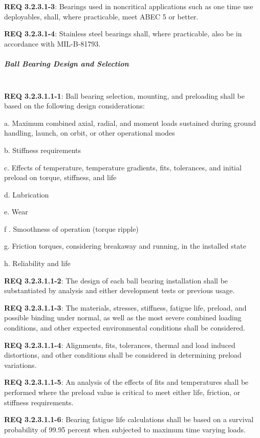 \documentclass[12pt]{article}
\begin{document}
\noindent \textbf{REQ 3.2.3.1-3}: Bearings used in noncritical applications such as one time use deployables, shall, where practicable, meet ABEC 5 or better.

\noindent \textbf{REQ 3.2.3.1-4}: Stainless steel bearings shall, where practicable, also be in accordance with MIL-B-81793.


\subparagraph{Ball Bearing Design and Selection} \mbox{} \\ %
\noindent \textbf{REQ 3.2.3.1.1-1}: Ball bearing selection, mounting, and preloading shall be based on the following design considerations:

a. Maximum combined axial, radial, and moment loads sustained during ground handling, launch, on orbit, or other operational modes

b. Stiffness requirements

c. Effects of temperature, temperature gradients, fits, tolerances, and initial preload on torque, stiffness, and life

d. Lubrication

e. Wear

f . Smoothness of operation (torque ripple)

g. Friction torques, considering breakaway and running, in the installed state

h. Reliability and life

\noindent \textbf{REQ 3.2.3.1.1-2}: The design of each ball bearing installation shall be substantiated by analysis and either development tests or previous usage. 

\noindent \textbf{REQ 3.2.3.1.1-3}: The materials, stresses, stiffness, fatigue life, preload, and possible binding under normal, as well as the most severe combined loading conditions, and other expected environmental conditions shall be considered. 

\noindent \textbf{REQ 3.2.3.1.1-4}: Alignments, fits, tolerances, thermal and load induced distortions, and other conditions shall be considered in determining preload variations. 

\noindent \textbf{REQ 3.2.3.1.1-5}: An analysis of the effects of fits and temperatures shall be performed where the preload value is critical to meet either life, friction, or stiffness requirements. 

\noindent \textbf{REQ 3.2.3.1.1-6}: Bearing fatigue life calculations shall be based on a survival probability of 99.95 percent when subjected to maximum time varying loads. 
\end{document}
